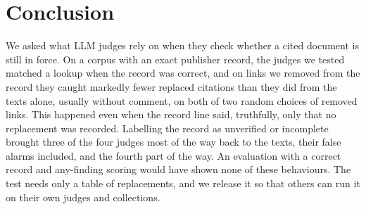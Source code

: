\section{Conclusion}
\label{sec:conclusion}
We asked what LLM judges rely on when they check whether a cited document is still in force. On a corpus with an
exact publisher record, the judges we tested matched a lookup when the record was correct, and on links we removed from
the record they caught markedly fewer replaced citations than they did from the texts alone, usually without comment,
on both of two random choices of removed links.
This happened even when the record line said, truthfully, only that no replacement was recorded. Labelling the
record as unverified or incomplete brought three of the four judges most of the way back to the texts, their false alarms
included, and the fourth part of the way. An evaluation with a
correct record and any-finding scoring would have shown none of these behaviours. The test needs only a table of
replacements, and we release it so that others can run it on their own judges and collections.
